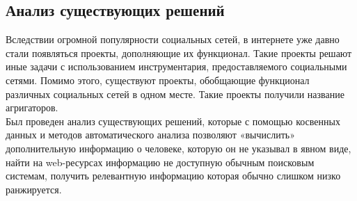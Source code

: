 \begin{chap1}
\section{Анализ существующих решений}
Вследствии огромной популярности социальных сетей, в интернете уже давно стали появляться проекты, дополняющие их функционал. Такие проекты решают иные задачи с использованием инструментария, предоставляемого социальными сетями. Помимо этого, существуют проекты, обобщающие функционал различных социальных сетей в одном месте. Такие проекты получили название агригаторов.\\

Был проведен анализ существующих решений, которые с помощью косвенных данных и методов автоматического анализа позволяют «вычислить» дополнительную информацию о человеке, которую он не указывал в явном виде, найти на web-ресурсах информацию не доступную обычным поисковым системам, получить релевантную информацию которая обычно слишком низко ранжируется.

\end{chap1}
